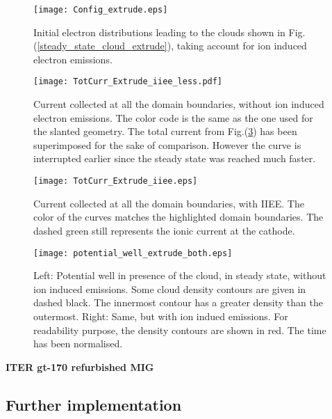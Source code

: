 \begin{figure}[h!]
\centering
	\texttt{[image: Config\_extrude.eps]}
	\caption{\label{Config_extrude} Initial electron distributions leading to the clouds shown in Fig.(\ref{steady_state_cloud_extrude}), taking account for ion induced electron emissions.}
\end{figure}


\begin{figure}[h!]
\centering
	\texttt{[image: TotCurr\_Extrude\_iiee\_less.pdf]}
	\caption{\label{TotCurr_Extrude_iiee_less} Current collected at all the domain boundaries, without ion induced electron emissions. The color code is the same as the one used for the slanted geometry. The total current from Fig.(\ref{TotCurr_Extrude_iiee}) has been superimposed for the sake of comparison. However the curve is interrupted earlier since the steady state was reached much faster.}
\end{figure}

\begin{figure}[h!]
\centering
	\texttt{[image: TotCurr\_Extrude\_iiee.eps]}
	\caption{\label{TotCurr_Extrude_iiee} Current collected at all the domain boundaries, with IIEE. The color of the curves matches the highlighted domain boundaries. The dashed green still represents the ionic current at the cathode.  }
\end{figure}


\begin{figure}[h!]
\centering
	\texttt{[image: potential\_well\_extrude\_both.eps]}
	\caption{\label{potential_well_extrude_both} Left: Potential well in presence of the cloud, in steady state, without ion induced emissions. Some cloud density contours are given in dashed black. The innermost contour has a greater density than the outermost. Right: Same, but with ion indued emissions. For readability purpose, the density contours are shown in red. The time has been normalised.}
\end{figure}


\newpage
\textbf{ITER gt-170 refurbished MIG}\\

\newpage
\subsection{Further implementation}